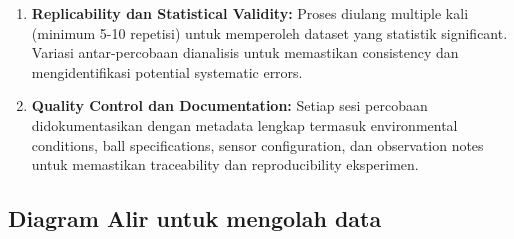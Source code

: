 \documentclass[a4paper,10pt]{article}
\begin{document}
\begin{enumerate}
\item \textbf{Replicability dan Statistical Validity:} Proses diulang multiple kali (minimum 5-10 repetisi) untuk memperoleh dataset yang statistik significant. Variasi antar-percobaan dianalisis untuk memastikan consistency dan mengidentifikasi potential systematic errors.

\item \textbf{Quality Control dan Documentation:} Setiap sesi percobaan didokumentasikan dengan metadata lengkap termasuk environmental conditions, ball specifications, sensor configuration, dan observation notes untuk memastikan traceability dan reproducibility eksperimen.
\end{enumerate}

\newpage

\subsection{Diagram Alir untuk mengolah data}
\end{document}
